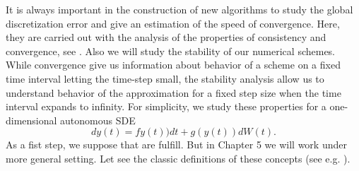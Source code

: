 	It is always important in the construction of  new algorithms to study  the global
discretization error and give an estimation of the speed of convergence. Here, they are
carried out with  the analysis of the properties of consistency and convergence, see
\cite{Kloeden1992}. 
Also we will study the stability of our numerical schemes. While convergence give us
information about behavior of a scheme on a fixed time interval letting the time-step small, the stability analysis
allow us to understand behavior of the approximation for a fixed step size when the time interval expands to infinity.
For simplicity, we study these properties for a one-dimensional autonomous SDE
\begin{equation}\label{eqn:autonomousSDE}
	dy(t)=fy(t))dt+g(y(t))dW(t).
\end{equation}
As a fist step, we suppose that  are fulfill. But in Chapter 5 we will work under
more general setting. Let see the classic definitions of these concepts (see e.g. \cite{Kloeden1992}).

